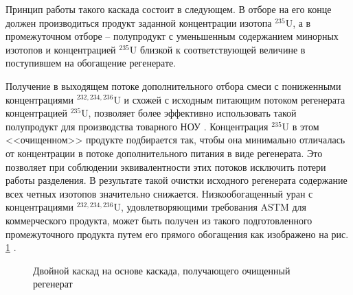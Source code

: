 Принцип работы такого каскада состоит в следующем. В отборе на его конце должен производиться продукт заданной концентрации изотопа $^{235}$U, а в промежуточном отборе -- полупродукт с уменьшенным содержанием минорных изотопов и концентрацией $^{235}$U близкой к соответствующей величине в поступившем на обогащение регенерате.

Получение в выходящем потоке дополнительного отбора смеси с пониженными концентрациями $^{232,234,236}$U и схожей с исходным питающим потоком регенерата концентрацией $^{235}$U, позволяет более эффективно использовать такой полупродукт для производства товарного НОУ \cite{palkinSeparationUraniumIsotopes2010}. Концентрация $^{235}$U в этом <<очищенном>> продукте подбирается так, чтобы она минимально отличалась от концентрации в потоке дополнительного питания в виде регенерата. Это позволяет при соблюдении эквивалентности этих потоков исключить потери работы разделения. В результате такой очистки исходного регенерата содержание всех четных изотопов значительно снижается. Низкообогащенный уран с концентрациями $^{232,234,236}$U, удовлетворяющими требования ASTM для коммерческого продукта, может быть получен из такого подготовленного промежуточного продукта путем его прямого обогащения как изображено на рис. \ref{fig:int_double} \cite{shopenSposobPolucheniyaRazbavitelya2008}.

\begin{figure}[ht]
  \caption{Двойной каскад на основе каскада, получающего очищенный регенерат}\label{fig:int_double}
\end{figure}


